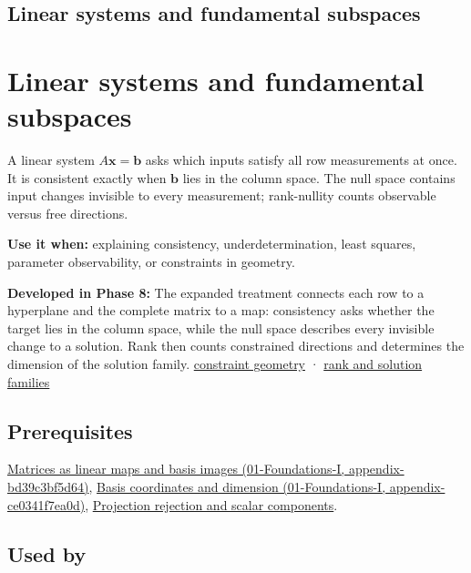 \hypertarget{appendix-8572a4a060c1}{}
\section*{Linear systems and fundamental subspaces}
\chapter{Linear systems and fundamental subspaces}\label{appendix-8572a4a060c1-linear-systems-and-fundamental-subspaces}

A linear system \(A\mathbf x=\mathbf b\) asks which inputs satisfy all row measurements at once. It is consistent exactly when \(\mathbf b\) lies in the column space. The null space contains input changes invisible to every measurement; rank-nullity counts observable versus free directions.

\textbf{Use it when:} explaining consistency, underdetermination, least squares, parameter observability, or constraints in geometry.

\textbf{Developed in Phase 8:} The expanded treatment connects each row to a hyperplane and the complete matrix to a map: consistency asks whether the target lies in the column space, while the null space describes every invisible change to a solution. Rank then counts constrained directions and determines the dimension of the solution family. \href{Continuous\%20Notes/Computing\%20Foundations\%20-\%20From\%20Bits\%20to\%20C++\%20and\%20Systems\%20APIs\#A\%20system\%20is\%20an\%20intersection\%20of\%20constraints}{constraint geometry} · \href{Continuous\%20Notes/Computing\%20Foundations\%20-\%20From\%20Bits\%20to\%20C++\%20and\%20Systems\%20APIs\#Rank,\%20the\%20four\%20spaces,\%20and\%20the\%20shape\%20of\%20the\%20answer}{rank and solution families}

\section{Prerequisites}\label{appendix-8572a4a060c1-prerequisites}

\href{../01-Foundations-I/main.pdf\#nameddest=appendix-bd39c3bf5d64}{Matrices as linear maps and basis images (01-Foundations-I, appendix-bd39c3bf5d64)}, \href{../01-Foundations-I/main.pdf\#nameddest=appendix-ce0341f7ea0d}{Basis coordinates and dimension (01-Foundations-I, appendix-ce0341f7ea0d)}, \hyperref[appendix-505a502c372a]{Projection rejection and scalar components}.

\section{Used by}\label{appendix-8572a4a060c1-used-by}

